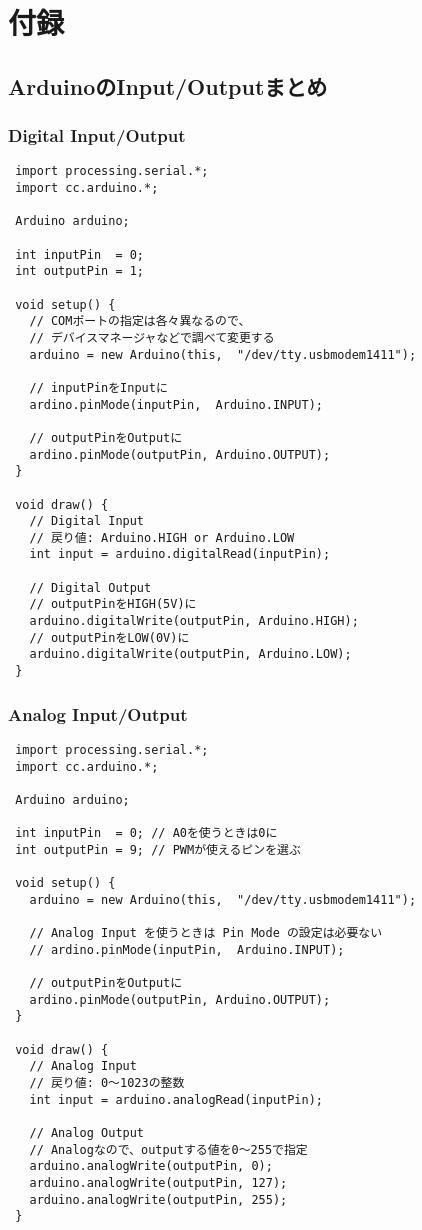 \documentclass[11pt,a4paper]{jarticle}
\begin{document}
\section*{付録}
\subsection*{ArduinoのInput/Outputまとめ}

\subsubsection*{Digital Input/Output}
\begin{lstlisting}
 import processing.serial.*;
 import cc.arduino.*;

 Arduino arduino;

 int inputPin  = 0;
 int outputPin = 1;

 void setup() {
   // COMポートの指定は各々異なるので、
   // デバイスマネージャなどで調べて変更する
   arduino = new Arduino(this,  "/dev/tty.usbmodem1411");

   // inputPinをInputに
   ardino.pinMode(inputPin,  Arduino.INPUT);

   // outputPinをOutputに 
   ardino.pinMode(outputPin, Arduino.OUTPUT);
 }

 void draw() {
   // Digital Input
   // 戻り値: Arduino.HIGH or Arduino.LOW
   int input = arduino.digitalRead(inputPin);

   // Digital Output
   // outputPinをHIGH(5V)に
   arduino.digitalWrite(outputPin, Arduino.HIGH);
   // outputPinをLOW(0V)に
   arduino.digitalWrite(outputPin, Arduino.LOW);
 } 
\end{lstlisting}

\newpage

\subsubsection*{Analog Input/Output}
\begin{lstlisting}
 import processing.serial.*;
 import cc.arduino.*;

 Arduino arduino;

 int inputPin  = 0; // A0を使うときは0に
 int outputPin = 9; // PWMが使えるピンを選ぶ 

 void setup() {
   arduino = new Arduino(this,  "/dev/tty.usbmodem1411");

   // Analog Input を使うときは Pin Mode の設定は必要ない
   // ardino.pinMode(inputPin,  Arduino.INPUT);

   // outputPinをOutputに 
   ardino.pinMode(outputPin, Arduino.OUTPUT);
 }

 void draw() {
   // Analog Input
   // 戻り値: 0〜1023の整数
   int input = arduino.analogRead(inputPin);

   // Analog Output
   // Analogなので、outputする値を0〜255で指定
   arduino.analogWrite(outputPin, 0);
   arduino.analogWrite(outputPin, 127);
   arduino.analogWrite(outputPin, 255);
 } 
\end{lstlisting}
\end{document}
